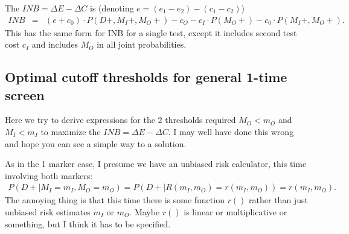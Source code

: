 \documentclass[11pt]{article}
\begin{document}
The $INB=\Delta E-\Delta C$ is (denoting $e=(e_1-e_2)-(c_1-c_2)$)
\begin{eqnarray*}
INB &=& (e+c_0)\cdot P(D+,M_I+,M_O+) - c_O - c_I\cdot P(M_O+) - c_0\cdot P(M_I+,M_O+).
\end{eqnarray*}
This has the same form for INB for a single test, except it includes second test cost $c_I$ and includes $M_O$ in all joint probabilities.


\subsection{Optimal cutoff thresholds for general 1-time screen}

Here we try to derive expressions for the 2 thresholds required $M_O<m_O$ and $M_I<m_I$ to maximize the $INB=\Delta E - \Delta C$.  I may well have done this wrong and hope you can see a simple way to a solution.

As in the 1 marker case, I presume we have an unbiased risk calculator, this time involving both markers:
\begin{eqnarray*}
P(D+|M_I=m_I,M_O=m_O) = P(D+|R(m_I,m_O)=r(m_I,m_O)) = r(m_I,m_O).
\end{eqnarray*}
The annoying thing is that this time there is some function $r()$ rather than just unbiased risk estimates $m_I$ or $m_O$.  Maybe $r()$ is linear or multiplicative or something, but I think it has to be specified.
\end{document}
